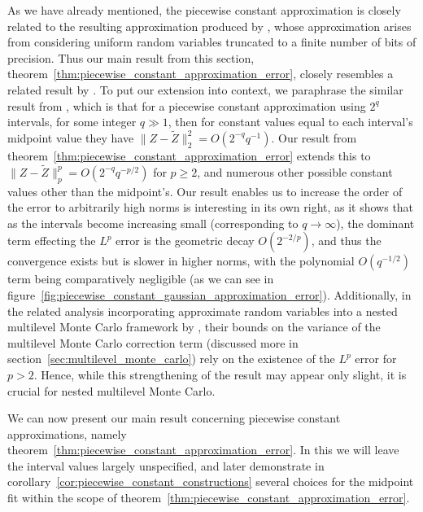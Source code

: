 \documentclass[manuscript,review]{acmart}
\begin{document}
As we have already mentioned, the piecewise constant approximation is closely related to the resulting approximation produced by \citet{giles2019random_quadrature}, whose approximation arises from considering uniform random variables truncated to a finite number of bits of precision. Thus our main result from this section, theorem~\ref{thm:piecewise_constant_approximation_error}, closely resembles a related result by \citet[theorem~1]{giles2019random_quadrature}. To put our extension into context, we paraphrase the similar result from \citet{giles2019random_quadrature}, which is that for a piecewise constant approximation using $ 2^q $ intervals, for some integer $ q \gg 1 $, then for constant values equal to each interval's midpoint value they have $ \lVert Z - \tilde{Z}\rVert_2^2 = O(2^{-q}q^{-1}) $. Our result from theorem~\ref{thm:piecewise_constant_approximation_error} extends this to $ \lVert Z - \tilde{Z}\rVert_p^p = O(2^{-q} q^{-p/2}) $ for $ p \geq 2 $, and numerous other possible constant values other than the midpoint's. Our result enables us to increase the order of the error to arbitrarily high norms is interesting in its own right, as it shows that as the intervals become increasing small (corresponding to $ q \to \infty $), the dominant term effecting the $ L^p $ error is the geometric decay $ O(2^{-2/p}) $, and thus the convergence exists but is slower in higher norms, with the polynomial $ O(q^{-1/2}) $ term being comparatively negligible (as we can see in figure~\ref{fig:piecewise_constant_gaussian_approximation_error}). Additionally, in the related analysis incorporating approximate random variables into a nested multilevel Monte Carlo framework by \citeauthor{giles2020approximate} \citep{giles2020approximate,sheridan2020nested}, their bounds on the variance of the multilevel Monte Carlo correction term (discussed more in section~\ref{sec:multilevel_monte_carlo}) rely on the existence of the $ L^p $ error for $ p > 2 $. Hence, while this strengthening of the result may appear only slight, it is crucial for nested multilevel Monte Carlo. 

We can now present our main result concerning piecewise constant approximations, namely theorem~\ref{thm:piecewise_constant_approximation_error}. In this we will leave the interval values largely unspecified, and later demonstrate in corollary~\ref{cor:piecewise_constant_constructions} several choices for the midpoint fit within the scope of theorem~\ref{thm:piecewise_constant_approximation_error}.
\end{document}
